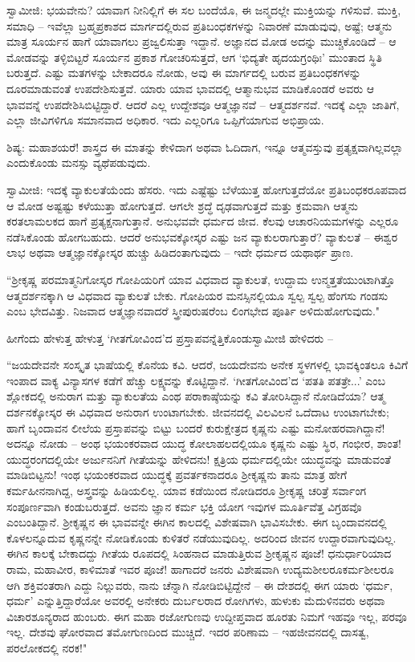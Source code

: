 ಸ್ವಾಮೀಜಿ: ಭಯವೇನು? ಯಾವಾಗ ನೀನಿಲ್ಲಿಗೆ ಈ ಸಲ ಬಂದೆಯೊ, ಈ ಜನ್ಮದಲ್ಲೇ ಮುಕ್ತಿಯನ್ನು ಗಳಿಸುವೆ. ಮುಕ್ತಿ, ಸಮಾಧಿ – ಇವೆಲ್ಲಾ ಬ್ರಹ್ಮಪ್ರಕಾಶದ ಮಾರ್ಗದಲ್ಲಿರುವ ಪ್ರತಿಬಂಧಕಗಳನ್ನು ನಿವಾರಣೆ ಮಾಡುವುವು, ಅಷ್ಟೆ; ಆತ್ಮನು ಮಾತ್ರ ಸೂರ್ಯನ ಹಾಗೆ ಯಾವಾಗಲು ಪ್ರಜ್ವಲಿಸುತ್ತಾ ಇದ್ದಾನೆ. ಅಜ್ಞಾನದ ಮೋಡ ಅದನ್ನು ಮುಚ್ಚಿಕೊಂಡಿದೆ – ಆ ಮೋಡವನ್ನು ತಳ್ಳಿಬಿಟ್ಟರೆ ಸೂರ್ಯನ ಪ್ರಕಾಶ ಗೋಚರಿಸುತ್ತದೆ, ಆಗ ‘ಭಿದ್ಯತೇ ಹೃದಯಗ್ರಂಥಿಃ’ ಮುಂತಾದ ಸ್ಥಿತಿ ಬರುತ್ತದೆ. ಎಷ್ಟು ಮತಗಳನ್ನು ಬೇಕಾದರೂ ನೋಡು, ಅವು ಈ ಮಾರ್ಗದಲ್ಲಿ ಬರುವ ಪ್ರತಿಬಂಧಕಗಳನ್ನು ದೂರಮಾಡುವಂತೆ ಉಪದೇಶಿಸುತ್ತವೆ. ಯಾರು ಯಾವ ಭಾವದಲ್ಲಿ ಆತ್ಮಾನುಭವ ಮಾಡಿಕೊಂಡರೆ ಅವರು ಆ ಭಾವವನ್ನೆ ಉಪದೇಶಿಸಿಬಿಟ್ಟಿದ್ದಾರೆ. ಆದರೆ ಎಲ್ಲ ಉದ್ದೇಶವೂ ಆತ್ಮಜ್ಞಾನವೆ – ಆತ್ಮದರ್ಶನವೆ. ಇದಕ್ಕೆ ಎಲ್ಲಾ ಜಾತಿಗೆ, ಎಲ್ಲಾ ಜೀವಿಗಳಿಗೂ ಸಮಾನವಾದ ಅಧಿಕಾರ. ಇದು ಎಲ್ಲರಿಗೂ ಒಪ್ಪಿಗೆಯಾಗುವ ಅಭಿಪ್ರಾಯ.

ಶಿಷ್ಯ: ಮಹಾಶಯರೆ! ಶಾಸ್ತ್ರದ ಈ ಮಾತನ್ನು ಕೇಳಿದಾಗ ಅಥವಾ ಓದಿದಾಗ, ಇನ್ನೂ ಆತ್ಮವಸ್ತುವು ಪ್ರತ್ಯಕ್ಷವಾಗಿಲ್ಲವಲ್ಲಾ ಎಂದುಕೊಂಡು ಮನಸ್ಸು ವ್ಯಥೆಪಡುವುದು.

\newpage

ಸ್ವಾಮೀಜಿ: ಇದಕ್ಕೆ ವ್ಯಾಕುಲತೆಯೆಂದು ಹೆಸರು. ಇದು ಎಷ್ಟೆಷ್ಟು ಬೆಳೆಯುತ್ತ ಹೋಗುತ್ತದೆಯೋ ಪ್ರತಿಬಂಧಕರೂಪವಾದ ಆ ಮೋಡ ಅಷ್ಟಷ್ಟು ಕಳೆಯುತ್ತಾ ಹೋಗುತ್ತದೆ. ಆಗಲೇ ಶ್ರದ್ಧೆ ದೃಢವಾಗುತ್ತದೆ ಮತ್ತು ಕ್ರಮವಾಗಿ ಆತ್ಮನು ಕರತಲಾಮಲಕದ ಹಾಗೆ ಪ್ರತ್ಯಕ್ಷನಾಗುತ್ತಾನೆ. ಅನುಭವವೇ ಧರ್ಮದ ಜೀವ. ಕೆಲವು ಆಚಾರನಿಯಮಗಳನ್ನು ಎಲ್ಲರೂ ನಡೆಸಿಕೊಂಡು ಹೋಗಬಹುದು. ಆದರೆ ಅನುಭವಕ್ಕೋಸ್ಕರ ಎಷ್ಟು ಜನ ವ್ಯಾಕುಲರಾಗುತ್ತಾರೆ? ವ್ಯಾಕುಲತೆ – ಈಶ್ವರ ಲಾಭ ಅಥವಾ ಆತ್ಮಜ್ಞಾನಕ್ಕೋಸ್ಕರ ಹುಚ್ಚು ಹಿಡಿದಂತಾಗುವುದು – ಇದೇ ಧರ್ಮದ ಯಥಾರ್ಥ ಪ್ರಾಣ.

“ಶ‍್ರೀಕೃಷ್ಣ ಪರಮಾತ್ಮನಿಗೋಸ್ಕರ ಗೋಪಿಯರಿಗೆ ಯಾವ ವಿಧವಾದ ವ್ಯಾಕುಲತೆ, ಉದ್ದಾಮ ಉನ್ಮತ್ತತೆಯುಂಟಾಗಿತ್ತೊ ಆತ್ಮದರ್ಶನಕ್ಕಾಗಿ ಆ ವಿಧವಾದ ವ್ಯಾಕುಲತೆ ಬೇಕು. ಗೋಪಿಯರ ಮನಸ್ಸಿನಲ್ಲಿಯೂ ಸ್ವಲ್ಪ ಸ್ವಲ್ಪ ಹೆಂಗಸು ಗಂಡಸು ಎಂಬ ಭೇದವಿತ್ತು. ನಿಜವಾದ ಆತ್ಮಜ್ಞಾನವಾದರೆ ಸ್ತ್ರೀಪುರುಷರೆಂಬ ಲಿಂಗಭೇದ ಪೂರ್ತಿ ಅಳಿದುಹೋಗುವುದು."

ಹೀಗೆಂದು ಹೇಳುತ್ತ ಹೇಳುತ್ತ ‘ಗೀತಗೋವಿಂದ’ದ ಪ್ರಸ್ತಾಪವನ್ನೆತ್ತಿಕೊಂಡು\break ಸ್ವಾಮೀಜಿ ಹೇಳಿದರು –

“ಜಯದೇವನೇ ಸಂಸ್ಕೃತ ಭಾಷೆಯಲ್ಲಿ ಕೊನೆಯ ಕವಿ. ಆದರೆ, ಜಯದೇವನು ಅನೇಕ ಸ್ಥಳಗಳಲ್ಲಿ ಭಾವಕ್ಕಿಂತಲೂ ಕಿವಿಗೆ ಇಂಪಾದ ವಾಕ್ಯ ವಿನ್ಯಾಸಗಳ ಕಡೆಗೆ ಹೆಚ್ಚು ಲಕ್ಷ್ಯವನ್ನು ಕೊಟ್ಟಿದ್ದಾನೆ. ‘ಗೀತಗೋವಿಂದ’ದ ‘ಪತತಿ ಪತತ್ರೇ...’ ಎಂಬ ಶ್ಲೋಕದಲ್ಲಿ ಅನುರಾಗ ಮತ್ತು ವ್ಯಾಕುಲತೆಯ ಎಂಥ ಪರಾಕಾಷ್ಠೆಯನ್ನು ಕವಿ ತೋರಿಸಿದ್ದಾನೆ ನೋಡಿದೆಯಾ? ಆತ್ಮ ದರ್ಶನಕ್ಕೋಸ್ಕರ ಈ ವಿಧವಾದ ಅನುರಾಗ ಉಂಟಾಗಬೇಕು. ಜೀವನದಲ್ಲಿ ವಿಲವಿಲನೆ ಒದೆದಾಟ ಉಂಟಾಗಬೇಕು; ಹಾಗೆ ಬೃಂದಾವನ ಲೀಲೆಯ ಪ್ರಸ್ತಾಪವನ್ನು ಬಿಟ್ಟು ಬಂದರೆ ಕುರುಕ್ಷೇತ್ರದ ಕೃಷ್ಣನು ಎಷ್ಟು ಮನೋಹರವಾಗಿದ್ದಾನೆ! ಅದನ್ನೂ ನೋಡು – ಅಂಥ ಭಯಂಕರವಾದ ಯುದ್ಧ ಕೋಲಾಹಲದಲ್ಲಿಯೂ ಕೃಷ್ಣನು ಎಷ್ಟು ಸ್ಥಿರ, ಗಂಭೀರ, ಶಾಂತ! ಯುದ್ಧರಂಗದಲ್ಲಿಯೇ ಅರ್ಜುನನಿಗೆ ಗೀತೆಯನ್ನು ಹೇಳಿದನು! ಕ್ಷತ್ರಿಯ ಧರ್ಮದಲ್ಲಿಯೇ ಯುದ್ಧವನ್ನು ಮಾಡುವಂತೆ ಮಾಡಿಬಿಟ್ಟನು! ಇಂಥ ಭಯಂಕರವಾದ ಯುದ್ಧಕ್ಕೆ ಪ್ರವರ್ತಕನಾದರೂ ಶ‍್ರೀಕೃಷ್ಣನು ತಾನು ಮಾತ್ರ ಹೇಗೆ ಕರ್ಮಹೀನನಾಗಿದ್ದ, ಅಸ್ತ್ರವನ್ನು ಹಿಡಿಯಲಿಲ್ಲ. ಯಾವ ಕಡೆಯಿಂದ ನೋಡಿದರೂ ಶ‍್ರೀಕೃಷ್ಣ ಚರಿತ್ರೆ ಸರ್ವಾಂಗ ಸಂಪೂರ್ಣವಾಗಿ ಕಂಡುಬರುತ್ತದೆ. ಅವನು ಜ್ಞಾನ ಕರ್ಮ ಭಕ್ತಿ ಯೋಗ ಇವುಗಳ ಮೂರ್ತಿವೆತ್ತ ವಿಗ್ರಹವೊ ಎಂಬಂತಿದ್ದಾನೆ. ಶ‍್ರೀಕೃಷ್ಣನ ಈ ಭಾವವನ್ನೇ ಈಗಿನ ಕಾಲದಲ್ಲಿ ವಿಶೇಷವಾಗಿ ಭಾವಿಸಬೇಕು. ಈಗ ಬೃಂದಾವನದಲ್ಲಿ ಕೊಳಲನ್ನೂದುವ ಕೃಷ್ಣನನ್ನೇ ನೋಡಿಕೊಂಡು ಕುಳಿತರೆ ನಡೆಯುವುದಿಲ್ಲ. ಅದರಿಂದ ಜೀವನ ಉದ್ದಾರವಾಗುವುದಿಲ್ಲ. ಈಗಿನ ಕಾಲಕ್ಕೆ ಬೇಕಾದದ್ದು ಗೀತೆಯ ರೂಪದಲ್ಲಿ ಸಿಂಹನಾದ ಮಾಡುತ್ತಿರುವ ಶ‍್ರೀಕೃಷ್ಣನ ಪೂಜೆ! ಧನುರ್ಧಾರಿಯಾದ ರಾಮ, ಮಹಾವೀರ, ಕಾಳಿಮಾತೆ ಇವರ ಪೂಜೆ! ಹಾಗಾದರೆ ಜನರು ವಿಶೇಷವಾಗಿ ಉದ್ಯಮಶೀಲರೂ\break ಕರ್ಮಶೀಲರೂ ಆಗಿ ಶಕ್ತಿವಂತರಾಗಿ ಎದ್ದು ನಿಲ್ಲುವರು, ನಾನು ಚೆನ್ನಾಗಿ ನೋಡಿಬಿಟ್ಟಿದ್ದೇನೆ – ಈ ದೇಶದಲ್ಲಿ ಈಗ ಯಾರು ‘ಧರ್ಮ, ಧರ್ಮ’ ಎನ್ನುತ್ತಿದ್ದಾರೆಯೋ ಅವರಲ್ಲಿ ಅನೇಕರು ದುರ್ಬಲರಾದ ರೋಗಿಗಳು, ಹುಳುಕು ಮೆದುಳಿನವರು ಅಥವಾ ವಿಚಾರಶೂನ್ಯರಾದ ಹುಂಬರು. ಈಗ ಮಹಾ ರಜೋಗುಣವು ಉದ್ದೀಪ್ತವಾದ ಹೂರತು ನಿಮಗೆ ಇಹವೂ ಇಲ್ಲ, ಪರವೂ ಇಲ್ಲ. ದೇಶವು ಘೋರವಾದ ತಮೋಗುಣದಿಂದ ಮುಚ್ಚಿದೆ. ಇದರ ಪರಿಣಾಮ – ಇಹಜೀವನದಲ್ಲಿ ದಾಸತ್ವ, ಪರಲೋಕದಲ್ಲಿ ನರಕ!"


